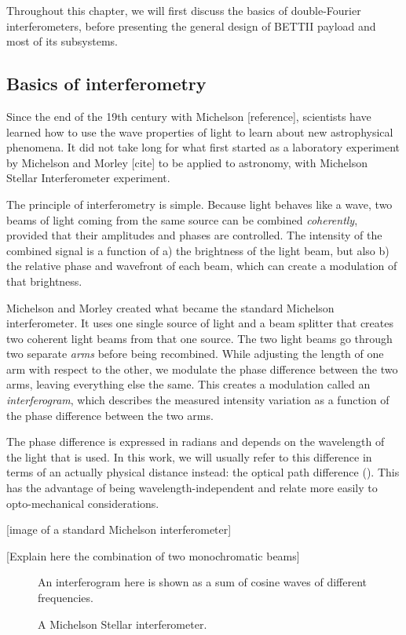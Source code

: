 Throughout this chapter, we will first discuss the basics of double-Fourier interferometers, before presenting the general design of BETTII payload and most of its subsystems.


\subsection{Basics of interferometry}

Since the end of the 19th century with Michelson [reference], scientists have learned how to use the wave properties of light to learn about new astrophysical phenomena. It did not take long for what first started as a laboratory experiment by Michelson and Morley [cite] to be applied to astronomy, with Michelson Stellar Interferometer experiment. 

The principle of interferometry is simple. Because light behaves like a wave, two beams of light coming from the same source can be combined \textit{coherently}, provided that their amplitudes and phases are controlled. The intensity of the combined signal is a function of a) the brightness of the light beam, but also b) the relative phase and wavefront of each beam, which can create a modulation of that brightness.

Michelson and Morley created what became the standard Michelson interferometer. It uses one single source of light and a beam splitter that creates two coherent light beams from that one source. The two light beams go through two separate \textit{arms} before being recombined. While adjusting the length of one arm with respect to the other, we modulate the phase difference between the two arms, leaving everything else the same. This creates a modulation called an \textit{interferogram}, which describes the measured intensity variation as a function of the phase difference between the two arms.

The phase difference is expressed in radians and depends on the wavelength of the light that is used. In this work, we will usually refer to this difference in terms of an actually physical distance instead: the optical path difference (\OPD). This has the advantage of being wavelength-independent and relate more easily to opto-mechanical considerations.

[image of a standard Michelson interferometer]

[Explain here the combination of two monochromatic beams]


\begin{figure}[!ht]
	\centering
	
	\caption[Simple interferogram]{An interferogram here is shown as a sum of cosine waves of different frequencies.}
	\label{fig:interferogram}
    \end{figure}
\begin{figure}[!ht]
	\centering
	
	\caption[Michelson interferometer]{A Michelson Stellar interferometer.}
	\label{fig:interferometer}
    \end{figure}


